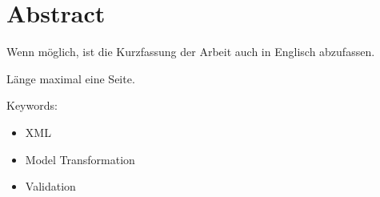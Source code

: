
\chapter*{Abstract}
\label{cha:abtract} 

Wenn möglich, ist die Kurzfassung der Arbeit auch in Englisch abzufassen.

Länge maximal eine Seite.

Keywords: 
\begin{itemize}
 \item XML
 \item Model Transformation
 \item Validation
\end{itemize}


